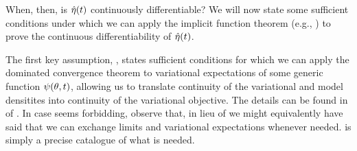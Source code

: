 
When, then, is $\hat\eta(t)$ continuously differentiable?  We will now state
some sufficient conditions under which we can apply the implicit function
theorem (e.g., \citet{krantz:2012:implicit}) to prove the continuous
differentiability of $\hat\eta(t)$.

The first key assumption, , states sufficient conditions
for which we can apply the dominated convergence theorem to variational
expectations of some generic function $\psi(\theta, t)$, allowing us to
translate continuity of the variational and model densitites into continuity of
the variational objective.  The details can be found in  of .
%
In case  seems forbidding, observe that, in lieu of
 we might equivalently have said that we can exchange
limits and variational expectations whenever needed.   is
simply a precise catalogue of what is needed.

%


%


